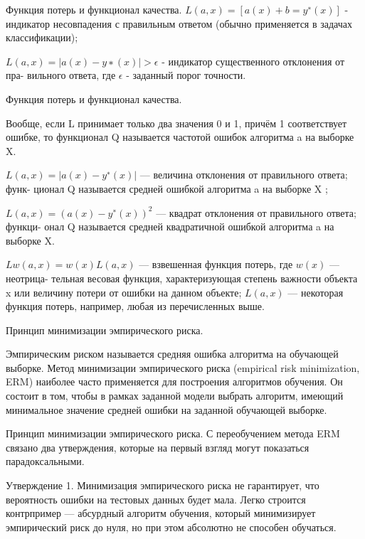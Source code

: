 \documentclass[10pt,pdf,hyperref={unicode}]{beamer}
\begin{document}
\begin{frame}{Функция потерь и функционал качества.}
$ L (a, x) = [a(x) + b = y^∗ (x)]$ - индикатор несовпадения с правильным ответом
(обычно применяется в задачах классификации);


$L (a, x) = |a(x) − y ∗ (x)| > \epsilon$  - индикатор существенного отклонения от пра-
вильного ответа, где $\epsilon$ - заданный порог точности.


\end{frame}

\begin{frame}{Функция потерь и функционал качества.}

Вообще, если L принимает только два значения 0 и 1, причём 1 соответствует ошибке,
 то функционал Q называется частотой ошибок алгоритма a на выборке X.

$L (a, x) = |a(x) − y^∗ (x)|$ — величина отклонения от правильного ответа; функ-
ционал Q называется средней ошибкой алгоритма a на выборке X ;

$L (a, x) = (a(x)−y^∗ (x))^2$ — квадрат отклонения от правильного ответа; функци-
онал Q называется средней квадратичной ошибкой алгоритма a на выборке X.

$L w (a, x) = w(x)L (a, x)$ — взвешенная функция потерь, где $w(x)$ — неотрица-
тельная весовая функция, характеризующая степень важности объекта x или
величину потери от ошибки на данном объекте; $L (a, x)$ — некоторая функция
потерь, например, любая из перечисленных выше.


\end{frame}




 
\begin{frame}{Принцип минимизации эмпирического риска.}

Эмпирическим риском называется средняя ошибка алгоритма на обучающей выборке. Метод минимизации эмпирического риска (empirical risk minimization, ERM) наиболее часто применяется для построения алгоритмов обучения. Он состоит в том, чтобы в рамках заданной модели выбрать алгоритм, имеющий минимальное значение средней ошибки на заданной обучающей выборке.

\end{frame}

\begin{frame}{Принцип минимизации эмпирического риска.}
С переобучением метода ERM связано два утверждения, которые на первый взгляд могут показаться парадоксальными.

Утверждение 1. Минимизация эмпирического риска не гарантирует, что вероятность ошибки на тестовых данных будет мала. Легко строится контрпример — абсурдный алгоритм обучения, который минимизирует эмпирический риск до нуля, но при этом абсолютно не способен обучаться. 

\end{frame}
\end{document}
